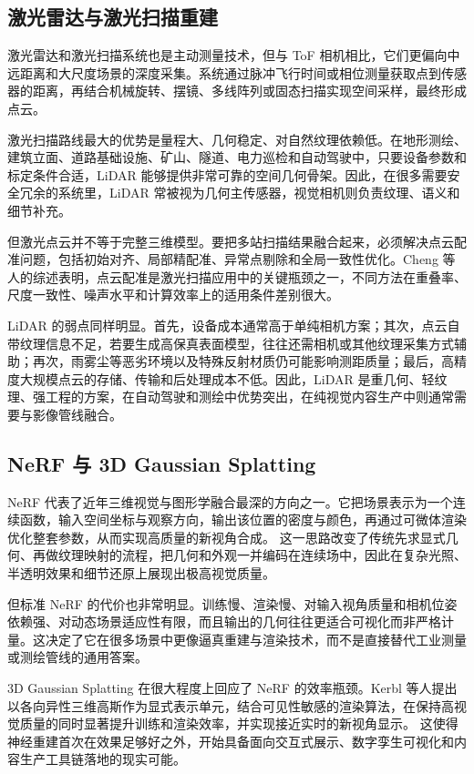 \documentclass[12pt,a4paper]{ctexart}
\begin{document}
\subsection{激光雷达与激光扫描重建}

激光雷达和激光扫描系统也是主动测量技术，但与 ToF 相机相比，它们更偏向中远距离和大尺度场景的深度采集。系统通过脉冲飞行时间或相位测量获取点到传感器的距离，再结合机械旋转、摆镜、多线阵列或固态扫描实现空间采样，最终形成点云。\cite{cheng2018laser}

激光扫描路线最大的优势是量程大、几何稳定、对自然纹理依赖低。在地形测绘、建筑立面、道路基础设施、矿山、隧道、电力巡检和自动驾驶中，只要设备参数和标定条件合适，LiDAR 能够提供非常可靠的空间几何骨架。因此，在很多需要安全冗余的系统里，LiDAR 常被视为几何主传感器，视觉相机则负责纹理、语义和细节补充。

但激光点云并不等于完整三维模型。要把多站扫描结果融合起来，必须解决点云配准问题，包括初始对齐、局部精配准、异常点剔除和全局一致性优化。Cheng 等人的综述表明，点云配准是激光扫描应用中的关键瓶颈之一，不同方法在重叠率、尺度一致性、噪声水平和计算效率上的适用条件差别很大。\cite{cheng2018laser}

LiDAR 的弱点同样明显。首先，设备成本通常高于单纯相机方案；其次，点云自带纹理信息不足，若要生成高保真表面模型，往往还需相机或其他纹理采集方式辅助；再次，雨雾尘等恶劣环境以及特殊反射材质仍可能影响测距质量；最后，高精度大规模点云的存储、传输和后处理成本不低。因此，LiDAR 是重几何、轻纹理、强工程的方案，在自动驾驶和测绘中优势突出，在纯视觉内容生产中则通常需要与影像管线融合。

\subsection{NeRF 与 3D Gaussian Splatting}

NeRF 代表了近年三维视觉与图形学融合最深的方向之一。它把场景表示为一个连续函数，输入空间坐标与观察方向，输出该位置的密度与颜色，再通过可微体渲染优化整套参数，从而实现高质量的新视角合成。\cite{mildenhall2020nerf} 这一思路改变了传统先求显式几何、再做纹理映射的流程，把几何和外观一并编码在连续场中，因此在复杂光照、半透明效果和细节还原上展现出极高视觉质量。

但标准 NeRF 的代价也非常明显。训练慢、渲染慢、对输入视角质量和相机位姿依赖强、对动态场景适应性有限，而且输出的几何往往更适合可视化而非严格计量。这决定了它在很多场景中更像逼真重建与渲染技术，而不是直接替代工业测量或测绘管线的通用答案。\cite{mildenhall2020nerf}

3D Gaussian Splatting 在很大程度上回应了 NeRF 的效率瓶颈。Kerbl 等人提出以各向异性三维高斯作为显式表示单元，结合可见性敏感的渲染算法，在保持高视觉质量的同时显著提升训练和渲染效率，并实现接近实时的新视角显示。\cite{kerbl2023gaussian} 这使得神经重建首次在效果足够好之外，开始具备面向交互式展示、数字孪生可视化和内容生产工具链落地的现实可能。
\end{document}
